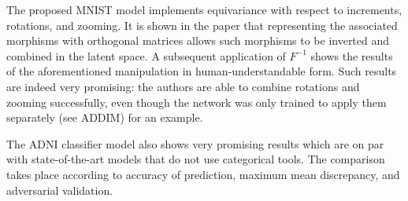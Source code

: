 \documentclass[11pt,a4paper,openright,twoside]{report}
\theoremstyle{plain}
\theoremstyle{definition}
\begin{document}
The proposed MNIST model implements equivariance with respect to increments, rotations, and zooming. It is shown in the paper that representing the associated morphisms with orthogonal matrices allows such morphisms to be inverted and combined in the latent space. A subsequent application of $F^{-1}$ shows the results of the aforementioned manipulation in human-understandable form. Such results are indeed very promising: the authors are able to combine rotations and zooming successfully, even though the network was only trained to apply them separately (see ADDIM) for an example.


The ADNI classifier model also shows very promising results which are on par with state-of-the-art models that do not use categorical tools. The comparison takes place according to accuracy of prediction, maximum mean discrepancy, and adversarial validation.





\clearpage{\pagestyle{empty}\cleardoublepage}
\end{document}
